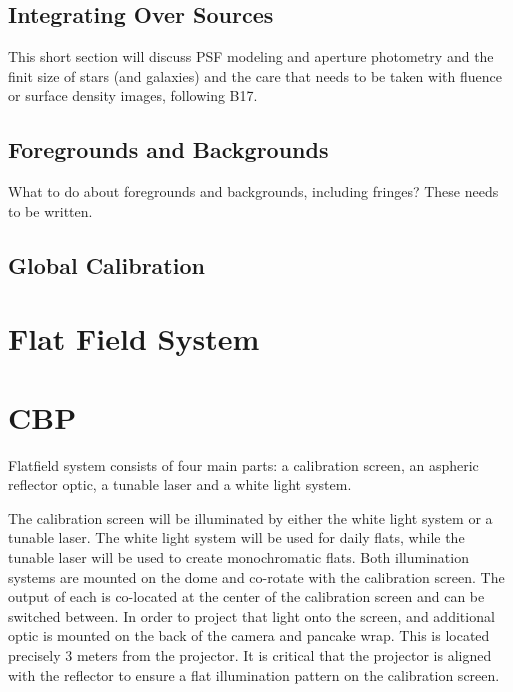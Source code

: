 \documentclass[SE,authoryear,lsstdraft,toc]{lsstdoc}
\begin{document}
\subsection{Integrating Over Sources}

This short section will discuss PSF modeling and aperture photometry and the
finit size of stars (and galaxies) and the care that needs to be taken with
fluence or surface density images, following B17.

\subsection{Foregrounds and Backgrounds}

What to do about foregrounds and backgrounds, including fringes?  These needs
to be written.

\subsection{Global Calibration}

\section{Flat Field System}


\section{CBP}

Flatfield system consists of four main parts: a calibration screen, an aspheric reflector optic, a tunable laser and a white light system. 

The calibration screen will be illuminated by either the white light system or a tunable laser. The white light system will be used for daily flats, while the tunable laser will be used to create monochromatic flats. Both illumination systems are mounted on the dome and co-rotate with the calibration screen. The output of each is co-located at the center of the calibration screen and can be switched between. In order to project that light onto the screen, and additional optic is mounted on the back of the camera and pancake wrap. This is located precisely 3 meters from the projector. It is critical that the projector is aligned with the reflector to ensure a flat illumination pattern on the calibration screen. 
\end{document}
